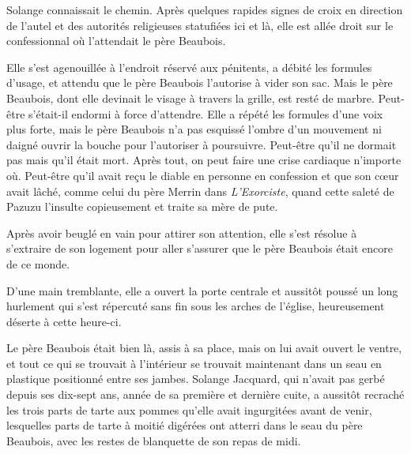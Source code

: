 Solange connaissait le chemin. Après quelques rapides signes de croix en direction de l’autel et des autorités religieuses statufiées ici et là, elle est allée droit sur le confessionnal où l’attendait le père Beaubois.

%

Elle s’est agenouillée à l’endroit réservé aux pénitents, a débité les formules d’usage, et attendu que le père Beaubois l’autorise à vider son sac. Mais le père Beaubois, dont elle devinait le visage à travers la grille, est resté de marbre. Peut-être s’était-il endormi à force d’attendre. Elle a répété les formules d’une voix plus forte, mais le père Beaubois n’a pas esquissé l’ombre d’un mouvement ni daigné ouvrir la bouche pour l’autoriser à poursuivre. Peut-être qu’il ne dormait pas mais qu’il était mort. Après tout, on peut faire une crise cardiaque n’importe où. Peut-être qu’il avait reçu le diable en personne en confession et que son cœur avait lâché, comme celui du père Merrin dans \textit{L’Exorciste}, quand cette saleté de Pazuzu l’insulte copieusement et traite sa mère de pute.

Après avoir beuglé en vain pour attirer son attention, elle s’est résolue à s’extraire de son logement pour aller s’assurer que le père Beaubois était encore de ce monde.

D’une main tremblante, elle a ouvert la porte centrale et aussitôt poussé un long hurlement qui s’est répercuté sans fin sous les arches de l’église, heureusement déserte à cette heure-ci.

Le père Beaubois était bien là, assis à sa place, mais on lui avait ouvert le ventre, et tout ce qui se trouvait à l’intérieur se trouvait maintenant dans un seau en plastique positionné entre ses jambes. Solange Jacquard, qui n’avait pas gerbé depuis ses dix-sept ans, année de sa première et dernière cuite, a aussitôt recraché les trois parts de tarte aux pommes qu’elle avait ingurgitées avant de venir, lesquelles parts de tarte à moitié digérées ont atterri dans le seau du père Beaubois, avec les restes de blanquette de son repas de midi.

